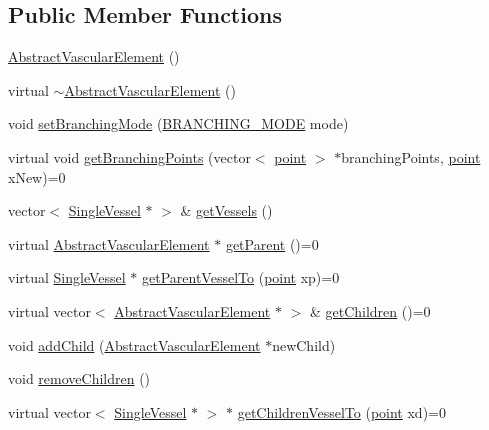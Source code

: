 \subsection*{Public Member Functions}
\begin{DoxyCompactItemize}
\item 
\hyperlink{class_abstract_vascular_element_af7280c0e7e9761f70a9dc556a51dd486}{Abstract\+Vascular\+Element} ()
\item 
virtual \hyperlink{class_abstract_vascular_element_ab5b056a128b4a72707070af67f5960ce}{$\sim$\+Abstract\+Vascular\+Element} ()
\item 
void \hyperlink{class_abstract_vascular_element_a9d5fd23d4e2cb02db821bc84ac3996e5}{set\+Branching\+Mode} (\hyperlink{class_abstract_vascular_element_a2f7b3a097b944cd0b056fee00b93c860}{B\+R\+A\+N\+C\+H\+I\+N\+G\+\_\+\+M\+O\+DE} mode)
\item 
virtual void \hyperlink{class_abstract_vascular_element_a0ec4dde7ce06f1d977d19b5a340eca52}{get\+Branching\+Points} (vector$<$ \hyperlink{structpoint}{point} $>$ $\ast$branching\+Points, \hyperlink{structpoint}{point} x\+New)=0
\item 
vector$<$ \hyperlink{class_single_vessel}{Single\+Vessel} $\ast$ $>$ \& \hyperlink{class_abstract_vascular_element_a07ae829d7cd20498629cb7b5bade2168}{get\+Vessels} ()
\item 
virtual \hyperlink{class_abstract_vascular_element}{Abstract\+Vascular\+Element} $\ast$ \hyperlink{class_abstract_vascular_element_aab59dfe7c6d4c846cb8f341727be8261}{get\+Parent} ()=0
\item 
virtual \hyperlink{class_single_vessel}{Single\+Vessel} $\ast$ \hyperlink{class_abstract_vascular_element_a4007ab14544d8fb5cacf5c610e9b0e5d}{get\+Parent\+Vessel\+To} (\hyperlink{structpoint}{point} xp)=0
\item 
virtual vector$<$ \hyperlink{class_abstract_vascular_element}{Abstract\+Vascular\+Element} $\ast$ $>$ \& \hyperlink{class_abstract_vascular_element_ae9cf2675f971fa470c74403c8b923f7d}{get\+Children} ()=0
\item 
void \hyperlink{class_abstract_vascular_element_a1ae7f338dcf49892e6be5dc77bae6359}{add\+Child} (\hyperlink{class_abstract_vascular_element}{Abstract\+Vascular\+Element} $\ast$new\+Child)
\item 
void \hyperlink{class_abstract_vascular_element_a1d2f7a213c823837e8a89adfff71ce0d}{remove\+Children} ()
\item 
virtual vector$<$ \hyperlink{class_single_vessel}{Single\+Vessel} $\ast$ $>$ $\ast$ \hyperlink{class_abstract_vascular_element_aac4f9650c704d920903c49270b18f717}{get\+Children\+Vessel\+To} (\hyperlink{structpoint}{point} xd)=0

\end{DoxyCompactItemize}
